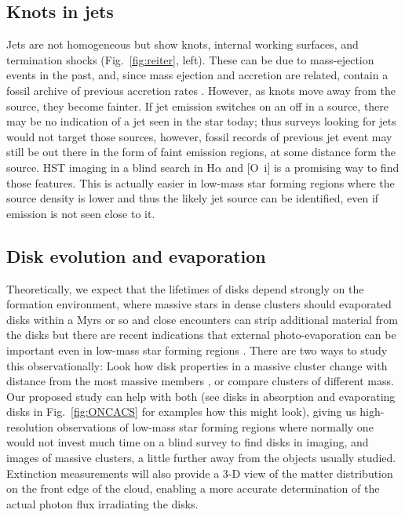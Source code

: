 \documentclass[12pt]{article}
\begin{document}
\subsection{Knots in jets}
Jets are not homogeneous but show knots, internal working surfaces, and termination shocks (Fig.~\ref{fig:reiter}, left). These can be due to mass-ejection events in the past, and, since mass ejection and accretion are related, contain a fossil archive of previous accretion rates \citep{2014A&A...563A..87E}. However, as knots move away from the source, they become fainter. If jet emission switches on an off in a source, there may be no indication of a jet seen in the star today; thus surveys looking for jets would not target those sources, however, fossil records of previous jet event may still be out there in the form of faint emission regions, at some distance form the source. HST imaging in a blind search in H$\alpha$ and [O~{\sc i}] is a promising way to find those features. This is actually easier in low-mass star forming regions where the source density is lower and thus the likely jet source can be identified, even if emission is not seen close to it.

\subsection{Disk evolution and evaporation}


Theoretically, we expect that the lifetimes of disks depend strongly on the formation environment, where massive stars in dense clusters should evaporated disks within a Myrs or so and close encounters can strip additional material from the disks \citep[e.g.][]{2004ApJ...611..360A,2019MNRAS.485.1489W,2019arXiv190211094N} but there are recent indications that external photo-evaporation can be important even in low-mass star forming regions \citep{2017MNRAS.468L.108H}.
There are two ways to study this observationally: Look how disk properties in a massive cluster change with distance from the most massive members \citep{2014ApJ...784...82M,2017AJ....153..240A,2018ApJ...860...77E}, or compare clusters of different mass. Our proposed study can help with both (see disks in absorption and evaporating disks in Fig.~\ref{fig:ONCACS} for examples how this might look), giving us high-resolution observations of low-mass star forming regions where normally one would not invest much time on a blind survey to find disks in imaging, and images of massive clusters, a little further away from the objects usually studied. Extinction measurements will also provide a 3-D view of the matter distribution on the front edge of the cloud, enabling a more accurate determination of the actual photon flux irradiating the disks. 
\end{document}

